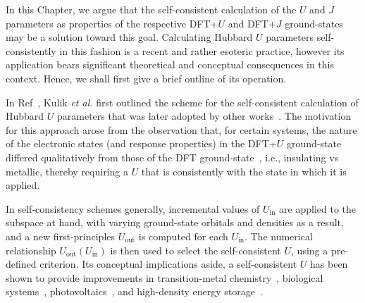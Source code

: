 {
In this Chapter, 
we argue that the self-consistent calculation 
of the $U$ and $J$ parameters 
as properties of the respective 
DFT+$U$ and DFT+$J$ ground-states 
may be a solution toward this goal.
%
Calculating Hubbard $U$ parameters self-consistently 
in this fashion is a recent and rather esoteric practice, 
however its application bears significant theoretical 
and conceptual consequences in this context.
%
Hence, we shall first give a brief outline 
of its operation.}

In Ref~\cite{PhysRevLett.97.103001}, 
Kulik {\it et al.} first outlined the scheme 
for the self-consistent calculation of 
Hubbard $U$ parameters 
that was later adopted by other 
works~\cite{PhysRevB.81.245113,0953-8984-22-5-055602,cococcioni4}.
% 
The motivation for this approach 
arose from the observation that, 
for certain systems,  
the nature of the electronic states  
(and response properties) 
in the DFT+$U$ ground-state differed
qualitatively from those of the DFT ground-state~\cite{PhysRevB.57.1505,PhysRevB.83.075112,PhysRevB.84.115108}, 
i.e., insulating vs metallic, 
thereby requiring a $U$ that is 
consistently with the state in which it is applied.
 
In self-consistency schemes  generally, 
incremental values of $U_\textrm{in}$ 
are applied to the subspace at hand,  
with varying ground-state orbitals and densities as a result,  
and a new first-principles $U_\textrm{out}$ 
is computed for each $U_\textrm{in}$.
%
The  numerical relationship 
$U_\textrm{out} ( U_\textrm{in} )$  
is then used to select the  
self-consistent $U$, using a pre-defined  criterion.
%
Its conceptual implications aside, a self-consistent $U$ 
has been shown to provide  
improvements in transition-metal 
chemistry~\cite{kulik2008self,:/content/aip/journal/jcp/133/11/10.1063/1.3489110,kulik2011transition,PhysRevB.84.115108,PhysRevLett.106.118501,Youmbi20141,2053-1591-3-8-086104,doi:10.1021/acs.jctc.6b00937,Hsu201019}, 
biological systems~\cite{doi:10.1021/jp070549l},
photovoltaics~\cite{PhysRevB.78.241201,PhysRevLett.105.146405,doi:10.1021/jp1041316}, 
and high-density energy storage~\cite{PhysRevB.93.085135}.

